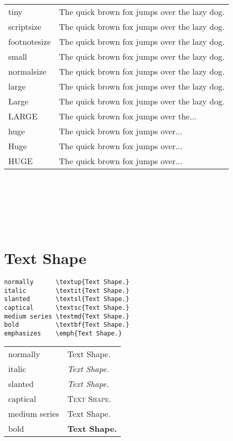 \documentclass[a4paper,12pt]{article}
\begin{document}
\begin{tabular}{l|l}
    tiny          & {\tiny The quick brown fox jumps over the lazy dog.}         \\  
    scriptsize    & {\scriptsize The quick brown fox jumps over the lazy dog.}   \\
    footnotesize  & {\footnotesize The quick brown fox jumps over the lazy dog.} \\
    small         & {\small The quick brown fox jumps over the lazy dog.}        \\
    normalsize    & {\normalsize The quick brown fox jumps over the lazy dog.}   \\
    large         & {\large The quick brown fox jumps over the lazy dog.}        \\
    Large         & {\Large The quick brown fox jumps over the lazy dog.}        \\
    LARGE         & {\LARGE The quick brown fox jumps over the...}               \\
    huge          & {\huge The quick brown fox jumps over...}                    \\
    Huge          & {\huge The quick brown fox jumps over...}                    \\
    HUGE          & {\huge The quick brown fox jumps over...}                    \\
\end{tabular} \\ \\ \\ \\ \\


\section*{Text Shape}

\begin{verbatim}
normally      \textup{Text Shape.}
italic        \textit{Text Shape.}
slanted       \textsl{Text Shape.}
captical      \textsc{Text Shape.}
medium series \textmd{Text Shape.}
bold          \textbf{Text Shape.}
emphasizes    \emph{Text Shape.}
\end{verbatim}

\begin{tabular}{l|l}
    normally & \textup{Text Shape.} \\  
    italic   & \textit{Text Shape.} \\
    slanted  & \textsl{Text Shape.} \\
    captical & \textsc{Text Shape.} \\
    medium series  & \textmd{Text Shape.} \\
    bold     & \textbf{Text Shape.} \\
\end{tabular} \\
\end{document}
